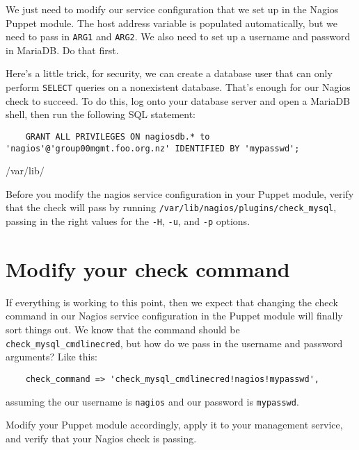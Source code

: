 \documentclass{article}         %
\begin{document}
We just need to modify our service configuration that we set up in the Nagios Puppet module. The host address variable is populated automatically, but we need to pass in \texttt{ARG1} and \texttt{ARG2}. We also need to set up a username and password in MariaDB. Do that first.

Here's a little trick, for security, we can create a database user that can only perform \texttt{SELECT} queries on a nonexistent database. That's enough for our Nagios check to succeed. To do this, log onto your database server and open a MariaDB shell, then run the following SQL statement:

\begin{verbatim}
    GRANT ALL PRIVILEGES ON nagiosdb.* to 'nagios'@'group00mgmt.foo.org.nz' IDENTIFIED BY 'mypasswd';
\end{verbatim}/var/lib/

Before you modify the nagios service configuration in your Puppet module, verify that the check will pass by running \texttt{/var/lib/nagios/plugins/check\_mysql}, passing in the right values for the \texttt{-H}, \texttt{-u}, and \texttt{-p} options.

\section{Modify your check command}
If everything is working to this point, then we expect that changing the check command in our Nagios service configuration in the Puppet module will finally sort things out. We know that the command should be \texttt{check\_mysql\_cmdlinecred}, but how do we pass in the username and password arguments? Like this:

\begin{verbatim}
    check_command => 'check_mysql_cmdlinecred!nagios!mypasswd',
\end{verbatim}

assuming the our username is \texttt{nagios} and our password is \texttt{mypasswd}. 

Modify your Puppet module accordingly, apply it to your management service, and verify that your Nagios check is passing.
\end{document}
